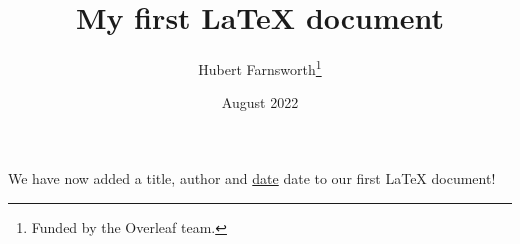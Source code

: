 \documentclass[12pt, letterpaper]{article}
\title{My first LaTeX document}
\author{Hubert Farnsworth\thanks{Funded by the Overleaf team.}}
\date{August 2022}
\begin{document}
\maketitle
We have now added a title, author and \underline{date} date to our first \LaTeX{} document!
\end{document}

